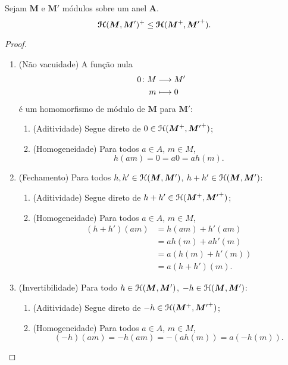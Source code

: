 \begin{proposition}
\label{prop:mod.subgrupo}
Sejam $\bm M$ e $\bm M'$ módulos sobre um anel $\bm A$.
	\begin{equation*}
	\bm{\mathcal{H}}(\bm M,\bm M')^+ \leq \bm{\mathcal{H}}(\bm M^+,{\bm M'}^+).
	\end{equation*}
\end{proposition}
\begin{proof}
	\begin{enumerate}
	\item (Não vacuidade) A função nula
		\begin{align*}
		\func{0}{M}{M'}{m}{0}
		\end{align*}
	é um homomorfismo de módulo de $\bm M$ para $\bm M'$:
		\begin{enumerate}
		\item (Aditividade) Segue direto de $0 \in \mathcal{H}(\bm M^+,{\bm M'}^+)$;
		\item (Homogeneidade) Para todos $a \in A$, $m \in M$,
			\begin{equation*}
			h(a m) = 0 = a0 = ah(m).
			\end{equation*}
		\end{enumerate}

	\item (Fechamento) Para todos $h,h' \in \mathcal{H}(\bm M,\bm M')$, $h+h' \in \mathcal{H}(\bm M,\bm M')$:
		\begin{enumerate}
		\item (Aditividade) Segue direto de $h+h' \in  \mathcal{H}(\bm M^+,{\bm M'}^+)$;
		\item (Homogeneidade) Para todos $a \in A$, $m \in M$,
			\begin{align*}
			(h+h')(am) &= h(am) + h'(am) \\
				&= ah(m) + ah'(m) \\
				&= a(h(m) + h'(m)) \\
				&= a(h+h')(m).
			\end{align*}
		\end{enumerate}

	\item (Invertibilidade) Para todo $h \in \mathcal{H}(\bm M,\bm M')$, $-h \in \mathcal{H}(\bm M,\bm M')$:
		\begin{enumerate}
		\item (Aditividade) Segue direto de $-h \in  \mathcal{H}(\bm M^+,{\bm M'}^+)$;
		\item (Homogeneidade) Para todos $a \in A$, $m \in M$,
			\begin{equation*}
			(-h)(am) = -h(am) = -(ah(m)) = a(-h(m)).
			\end{equation*}
		\end{enumerate}
	\end{enumerate}
\end{proof}

